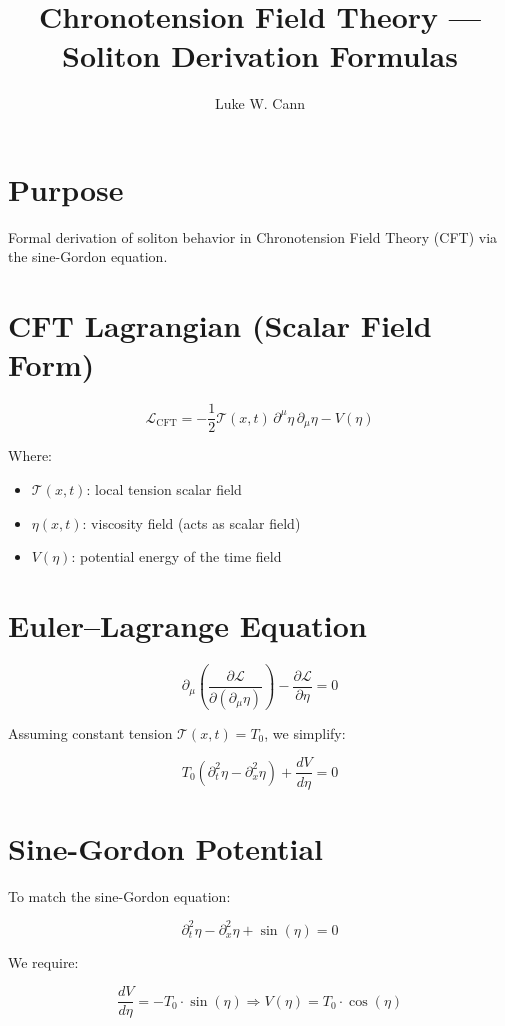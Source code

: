 \documentclass{article}
\title{Chronotension Field Theory --- Soliton Derivation Formulas}
\author{Luke W. Cann}
\date{}
\begin{document}
\maketitle

\section*{Purpose}
Formal derivation of soliton behavior in Chronotension Field Theory (CFT) via the sine-Gordon equation.

\section{CFT Lagrangian (Scalar Field Form)}

\[
\mathcal{L}_{\text{CFT}} = -\frac{1}{2} \mathcal{T}(x, t) \, \partial^\mu \eta \, \partial_\mu \eta - V(\eta)
\]

Where:
\begin{itemize}
  \item $\mathcal{T}(x,t)$: local tension scalar field
  \item $\eta(x,t)$: viscosity field (acts as scalar field)
  \item $V(\eta)$: potential energy of the time field
\end{itemize}

\section{Euler--Lagrange Equation}

\[
\partial_\mu \left( \frac{\partial \mathcal{L}}{\partial (\partial_\mu \eta)} \right) - \frac{\partial \mathcal{L}}{\partial \eta} = 0
\]

Assuming constant tension $\mathcal{T}(x,t) = T_0$, we simplify:

\[
T_0 (\partial_t^2 \eta - \partial_x^2 \eta) + \frac{dV}{d\eta} = 0
\]

\section{Sine-Gordon Potential}

To match the sine-Gordon equation:

\[
\partial_t^2 \eta - \partial_x^2 \eta + \sin(\eta) = 0
\]

We require:

\[
\frac{dV}{d\eta} = -T_0 \cdot \sin(\eta) \Rightarrow V(\eta) = T_0 \cdot \cos(\eta)
\]
\end{document}
